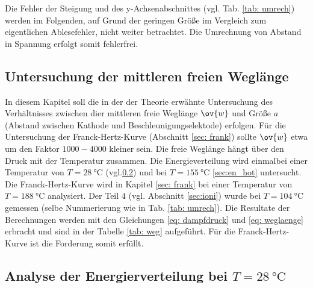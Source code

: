 Die Fehler der Steigung und des y-Achsenabschnittes (vgl. Tab. \ref{tab: umrech}) werden
im Folgenden, auf Grund der geringen Größe im Vergleich zum eigentlichen Ablesefehler, nicht weiter betrachtet.
Die Umrechnung von Abstand in Spannung erfolgt somit fehlerfrei.
\FloatBarrier %

\subsection{Untersuchung der mittleren freien Weglänge}
\FloatBarrier
In diesem Kapitel soll die in der der Theorie erwähnte Untersuchung des Verhältnisses
zwischen dier mittleren freie Weglänge $\ov{w}$ und Größe $a$
(Abstand zwischen Kathode und Beschleunigungselektode) erfolgen.
Für die Untersuchung der Franck-Hertz-Kurve (Abschnitt \ref{sec: frank}) %
sollte $\ov{w}$ etwa um den Faktor $1000-4000$ kleiner sein. Die freie Weglänge hängt über den  Druck mit der Temperatur zusammen. %
Die Energieverteilung wird einmalbei einer Temperatur von $T=\SI{28}{\celsius}$ (vgl.\ref{sec: eng_zim}) und bei $T=\SI{155}{\celsius}$ \ref{sec:en_hot} untersucht.
Die Franck-Hertz-Kurve wird in Kapitel \ref{sec: frank} bei einer Temperatur von $T=\SI{188}{\celsius}$ analysiert.  %
Der Teil $4$ (vgl. Abschnitt \ref{sec:ioni}) wurde bei $T=\SI{104}{\celsius}$ gemessen (selbe Nummerierung wie in Tab. \ref{tab: umrech}). %
Die Resultate der Berechnungen werden mit den Gleichungen \eqref{eq: dampfdruck} und \eqref{eq: weglaenge} erbracht und %
sind in der Tabelle \ref{tab: weg} aufgeführt.
Für die Franck-Hertz-Kurve ist die Forderung somit erfüllt. %



\subsection{Analyse der Energierverteilung bei $T=\SI{28}{\celsius}$}\label{sec: eng_zim}

